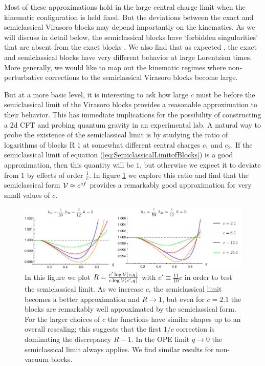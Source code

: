 Most of these approximations hold in the large central charge limit when the kinematic configuration is held fixed.  But the deviations between the exact and semiclassical Virasoro blocks may depend importantly on the kinematics.  As we will discuss in detail below, the semiclassical blocks have `forbidden singularities' that are absent from the exact blocks \cite{Fitzpatrick:2016ive}.  We also find that as expected \cite{Fitzpatrick:2016ive, Fitzpatrick:2016mjq}, the exact and semiclassical blocks have very different behavior at large Lorentzian times.  More generally, we would like to map out the kinematic regimes where non-perturbative corrections to the semiclassical Virasoro blocks become large.  

But at a more basic level, it is interesting to ask how large $c$ must be before the semiclassical limit of the Virasoro blocks provides a reasonable approximation to their behavior.  This has immediate implications for the possibility of constructing a 2d CFT and probing quantum gravity in an experimental lab.  A natural way to probe the existence of the semiclassical limit is by studying the ratio of logarithms of blocks
\be
R \equiv {}  1
\ee
at somewhat different central charges $c_1$ and $c_2$.  If the semiclassical limit of equation (\ref{eq:SemiclassicalLimitofBlocks}) is a good approximation, then this quantity will be $1$, but otherwise we expect it to deviate from $1$ by effects of order $\frac{1}{c}$. In figure \ref{fig:RatioOfLogV} we explore this ratio and find that the semiclassical form ${\cal V} \approx e^{c f}$ provides a remarkably good approximation for very small values of $c$.

\begin{figure}
\centering
\includegraphics[scale=0.95]{virasoro_chapter/RatioOfLogV}	
\caption[Tests of semiclassical approximation in vacuum blocks]{In this figure we plot $R = \frac{ c' \log {\cal V}(c,q)}{c \log {\cal V}(c',q)}$ with  $c' \equiv \frac{11}{10}c$ in order to test the semiclassical limit. As we increase $c$, the semiclassical limit becomes a better approximation and $R \to 1$, but even for $c = 2.1$ the blocks are remarkably well approximated by the semiclassical form. For the larger choices of $c$ the functions have similar shapes up to an overall rescaling; this suggests that the first $1/c$ correction is dominating the discrepancy $R-1$.  In the OPE limit $q\rightarrow 0$ the semiclassical limit always applies. We find similar results for non-vacuum blocks. }
\label{fig:RatioOfLogV}
\end{figure}

